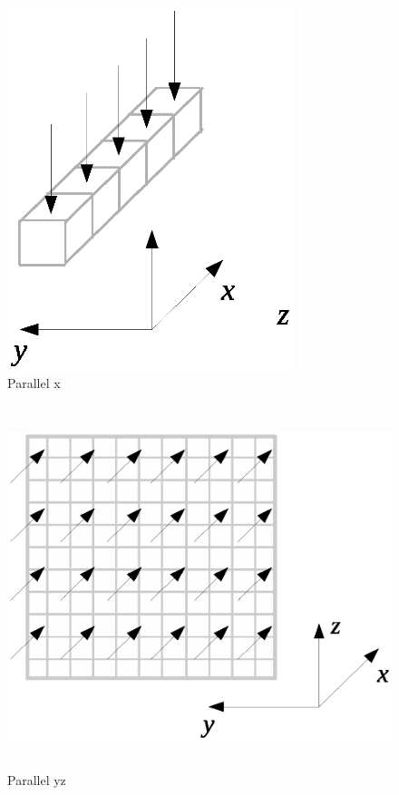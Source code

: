 \documentclass{article}
\begin{document}
\begin{figure}[h]
\begin{center}
\includegraphics[trim={{100pt} {150pt} {100pt} {150pt}}, clip, height=300pt]{img/parallel-x.eps}
\end{center}
\caption{Parallel x}
\label{fig:parallel-x}
\end{figure}




\begin{figure}[h]
\begin{center}
\includegraphics[trim={{100pt} {150pt} {100pt} {150pt}}, clip, height=300pt]{img/parallel-yz.eps}
\end{center}
\caption{Parallel yz}
\label{fig:parallel-yz}
\end{figure}
\end{document}
